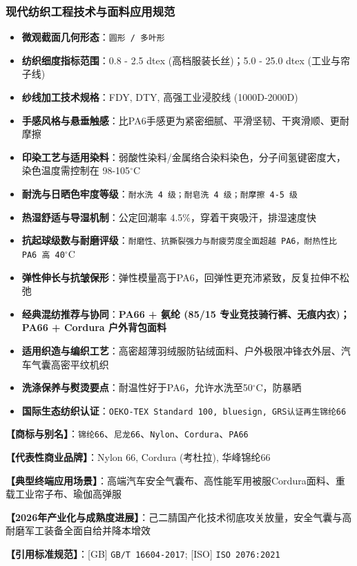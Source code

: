 \documentclass[11pt,openright,twoside,UTF8]{ctexbook}
\begin{document}
\subsubsection*{现代纺织工程技术与面料应用规范}
\begin{itemize} \setlength{\itemsep}{2pt}
    \item \textbf{微观截面几何形态}：\texttt{圆形 / 多叶形}
    \item \textbf{纺织细度指标范围}：0.8 - 2.5 dtex (高档服装长丝)；5.0 - 25.0 dtex (工业与帘子线)
    \item \textbf{纱线加工技术规格}：FDY, DTY, 高强工业浸胶线 (1000D-2000D)
    \item \textbf{手感风格与悬垂触感}：比PA6手感更为紧密细腻、平滑坚韧、干爽滑顺、更耐摩擦
    \item \textbf{印染工艺与适用染料}：弱酸性染料/金属络合染料染色，分子间氢键密度大，染色温度需控制在 98-105$^\circ\mathrm{C}$
    \item \textbf{耐洗与日晒色牢度等级}：\texttt{耐水洗 4 级；耐皂洗 4 级；耐摩擦 4-5 级}
    \item \textbf{热湿舒适与导湿机制}：公定回潮率 4.5\%，穿着干爽吸汗，排湿速度快
    \item \textbf{抗起球级数与耐磨评级}：\texttt{耐磨性、抗撕裂强力与耐疲劳度全面超越 PA6，耐热性比 PA6 高 40$^\circ\mathrm{C}$}
    \item \textbf{弹性伸长与抗皱保形}：弹性模量高于PA6，回弹性更充沛紧致，反复拉伸不松弛
    \item \textbf{经典混纺推荐与协同}：\textbf{PA66 + 氨纶 (85/15 专业竞技骑行裤、无痕内衣)；PA66 + Cordura 户外背包面料}
    \item \textbf{适用织造与编织工艺}：高密超薄羽绒服防钻绒面料、户外极限冲锋衣外层、汽车气囊高密平纹机织
    \item \textbf{洗涤保养与熨烫要点}：耐温性好于PA6，允许水洗至50$^\circ\mathrm{C}$，防暴晒
    \item \textbf{国际生态纺织认证}：\texttt{OEKO-TEX Standard 100, bluesign, GRS认证再生锦纶66}
\end{itemize}
\vspace{0.2cm}

\noindent\textbf{【商标与别名】}：\texttt{锦纶66}、\texttt{尼龙66}、\texttt{Nylon}、\texttt{Cordura}、\texttt{PA66}\par
\noindent\textbf{【代表性商业品牌】}：Nylon 66, Cordura (考杜拉), 华峰锦纶66\par
\noindent\textbf{【典型终端应用场景】}：高端汽车安全气囊布、高性能军用被服Cordura面料、重载工业帘子布、瑜伽高弹服\par
\noindent\textbf{【2026年产业化与成熟度进展】}：己二腈国产化技术彻底攻关放量，安全气囊与高耐磨军工装备全面自给并降本增效\par
\noindent\textbf{【引用标准规范】}：[GB] \texttt{GB/T 16604-2017}; [ISO] \texttt{ISO 2076:2021}\par
\vspace{0.5cm}
\end{document}
